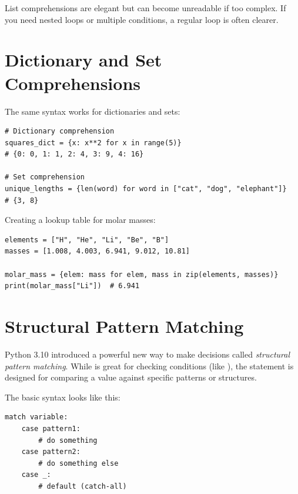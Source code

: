 \begin{tip}
List comprehensions are elegant but can become unreadable if too complex. If you need nested loops or multiple conditions, a regular  loop is often clearer.
\end{tip}

\section{Dictionary and Set Comprehensions}
\label{sec:other-comprehensions}

The same syntax works for dictionaries and sets:

\begin{lstlisting}
# Dictionary comprehension
squares_dict = {x: x**2 for x in range(5)}
# {0: 0, 1: 1, 2: 4, 3: 9, 4: 16}

# Set comprehension
unique_lengths = {len(word) for word in ["cat", "dog", "elephant"]}
# {3, 8}
\end{lstlisting}

\begin{labexample}
Creating a lookup table for molar masses:

\begin{lstlisting}
elements = ["H", "He", "Li", "Be", "B"]
masses = [1.008, 4.003, 6.941, 9.012, 10.81]

molar_mass = {elem: mass for elem, mass in zip(elements, masses)}
print(molar_mass["Li"])  # 6.941
\end{lstlisting}
\end{labexample}

\section{Structural Pattern Matching}
\label{sec:match-case}

Python 3.10 introduced a powerful new way to make decisions called \emph{structural pattern matching}. While  is great for checking conditions (like ), the  statement is designed for comparing a value against specific patterns or structures.

The basic syntax looks like this:

\begin{lstlisting}
match variable:
    case pattern1:
        # do something
    case pattern2:
        # do something else
    case _:
        # default (catch-all)
\end{lstlisting}

